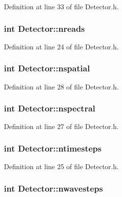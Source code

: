 Definition at line 33 of file Detector.h.

\hypertarget{classDetector_aab6efccaea99c3467b6e0082a7922cb8}{
\subsubsection[{nreads}]{\setlength{\rightskip}{0pt plus 5cm}int {\bf Detector::nreads}}}
\label{classDetector_aab6efccaea99c3467b6e0082a7922cb8}


Definition at line 24 of file Detector.h.

\hypertarget{classDetector_ad0d59d1328b59ce6c13f49361b50ac29}{
\subsubsection[{nspatial}]{\setlength{\rightskip}{0pt plus 5cm}int {\bf Detector::nspatial}}}
\label{classDetector_ad0d59d1328b59ce6c13f49361b50ac29}


Definition at line 28 of file Detector.h.

\hypertarget{classDetector_a83edf838e8d00d2286e2e75f54836601}{
\subsubsection[{nspectral}]{\setlength{\rightskip}{0pt plus 5cm}int {\bf Detector::nspectral}}}
\label{classDetector_a83edf838e8d00d2286e2e75f54836601}


Definition at line 27 of file Detector.h.

\hypertarget{classDetector_ada81397b9b56b728a7a6d20b48d40e2d}{
\subsubsection[{ntimesteps}]{\setlength{\rightskip}{0pt plus 5cm}int {\bf Detector::ntimesteps}}}
\label{classDetector_ada81397b9b56b728a7a6d20b48d40e2d}


Definition at line 25 of file Detector.h.

\hypertarget{classDetector_aa5e5de28e589cc3cee8ee535ba03d34a}{
\subsubsection[{nwavesteps}]{\setlength{\rightskip}{0pt plus 5cm}int {\bf Detector::nwavesteps}}}
\label{classDetector_aa5e5de28e589cc3cee8ee535ba03d34a}


